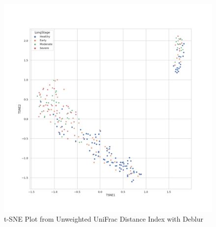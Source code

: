 \documentclass[a4paper]{article}
\begin{document}
            \begin{figure}[p]
                \centering
                \includegraphics[width=0.6 \linewidth]{figures/BetaDiversity/Deblur.unweighted_unifrac.png}
                \caption{t-SNE Plot from Unweighted UniFrac Distance Index with Deblur}
                \label{fig:tsne-unweighted-deblur}
            \end{figure}
\end{document}
